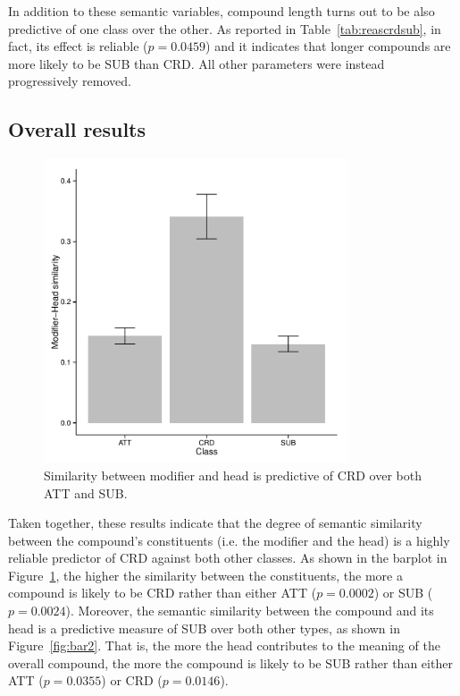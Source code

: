 \documentclass[output=paper]{langsci/langscibook}
\begin{document}
In addition to these semantic variables, compound length turns out to be also predictive of one class over the other. As reported in Table~\ref{tab:reascrdsub}, in fact, its effect is reliable ($p=0.0459$) and it indicates that longer compounds are more likely to be SUB than CRD. All other parameters were instead progressively removed.

\subsection{Overall results}

\begin{figure}
\begin{center}
\includegraphics[width=9cm]{figures/barplot1.pdf}
\caption{Similarity between modifier and head is predictive of CRD over both ATT and SUB.}\label{fig:bar1}
\end{center}
\end{figure}


Taken together, these results indicate that the degree of semantic similarity between the compound's constituents (i.e. the modifier and the head) is a highly reliable predictor of CRD against both other classes. As shown in the barplot in Figure~\ref{fig:bar1}, the higher the similarity between the constituents, the more a compound is likely to be CRD rather than either ATT ($p=0.0002$) or SUB ($p=0.0024$). Moreover, the semantic similarity between the compound and its head is a predictive measure of SUB over both other types, as shown in Figure~\ref{fig:bar2}. That is, the more the head contributes to the meaning of the overall compound, the more the compound is likely to be SUB rather than either ATT ($p=0.0355$) or CRD ($p=0.0146$).
\end{document}
